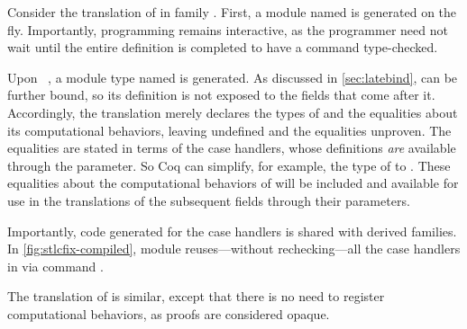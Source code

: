 Consider the translation of  in family .
First, a module named  is generated on the fly.
Importantly, programming remains interactive, as the programmer need not wait until the
entire  definition is completed to have a  command
type-checked.

Upon ~, a module type named  is generated.
%
As discussed in \cref{sec:latebind},  can be further bound,
so its definition is not exposed to the fields that come after it.
Accordingly, the translation  merely declares the types of 
and the equalities about its computational behaviors, leaving  undefined
and the equalities unproven.
%
The equalities are stated in terms of the case handlers,
whose definitions \emph{are} available through the  parameter.
So Coq can simplify, for example, the type of  to
.
These equalities about the computational behaviors of 
will be included and available for use in the translations of the
subsequent fields through their  parameters.

Importantly, code generated for the case handlers is shared with derived families.
In \cref{fig:stlcfix-compiled}, module 
reuses---without rechecking---all the case handlers in
 via command .

The translation of  is similar, except that there is no need to
register computational behaviors, as  proofs are considered opaque.



